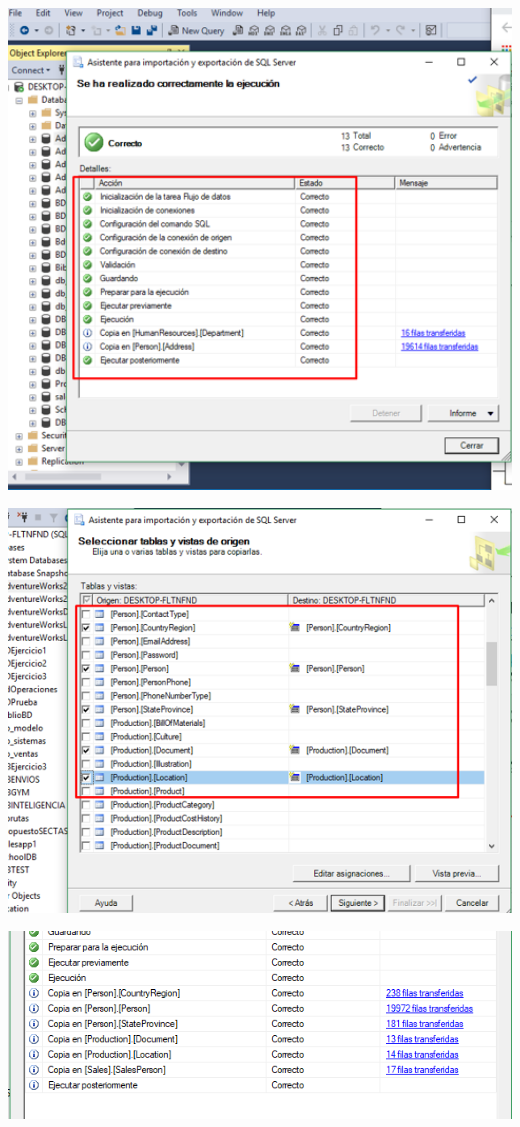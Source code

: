 \begin{itemize}
\begin{center}
	\includegraphics[width=14cm]{./Imagenes/tarea1_3}
	\end{center}
\begin{center}
	\includegraphics[width=14cm]{./Imagenes/tarea1_4}
	\end{center}
\begin{center}
	\includegraphics[width=14cm]{./Imagenes/tarea1_5}
	\end{center}


\end{itemize}
